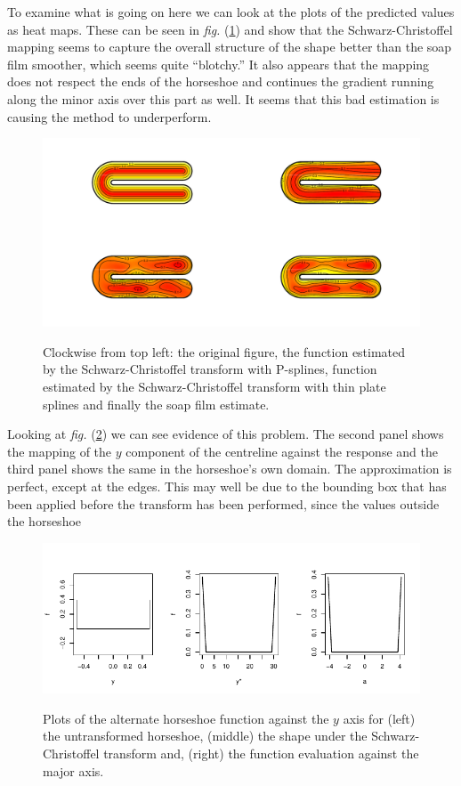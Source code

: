 \documentclass[a4paper,10pt]{amsart}
\newcommand{\sch}{Schwarz-Christoffel }
\newcommand{\fig}[1]{\emph{fig.} (\ref{#1})}
\begin{document}
To examine what is going on here we can look at the plots of the predicted values as heat maps. These can be seen in \fig{altramsaycomp} and show that the \sch mapping seems to capture the overall structure of the shape better than the soap film smoother, which seems quite ``blotchy.'' It also appears that the mapping does not respect the ends of the horseshoe and continues the gradient running along the minor axis over this part as well. It seems that this bad estimation is causing the method to underperform. 


\begin{figure}
\centering
\includegraphics[width=5in, trim=0in 0in 0in 0in]{figs/altramsaycomp.pdf}\\
\caption{Clockwise from top left: the original figure, the function estimated by the \sch transform with P-splines, function estimated by the \sch transform with thin plate splines and finally the soap film estimate.}
\label{altramsaycomp}
\end{figure}

Looking at \fig{altcentrelinelineplot} we can see evidence of this problem. The second panel shows the mapping of the $y$ component of the centreline against the response and the third panel shows the same in the horseshoe's own domain. The approximation is perfect, except at the edges. This may well be due to the bounding box that has been applied before the transform has been performed, since the values outside the horseshoe 

\begin{figure}
\centering
\includegraphics[trim=0in 0in 0in 0in]{figs/altcentrelinelineplots.pdf} \\
\caption{Plots of the alternate horseshoe function against the $y$ axis for (left) the untransformed horseshoe, (middle) the shape under the \sch transform and, (right) the function evaluation against the major axis.}
\label{altcentrelinelineplot}
\end{figure}
\end{document}
